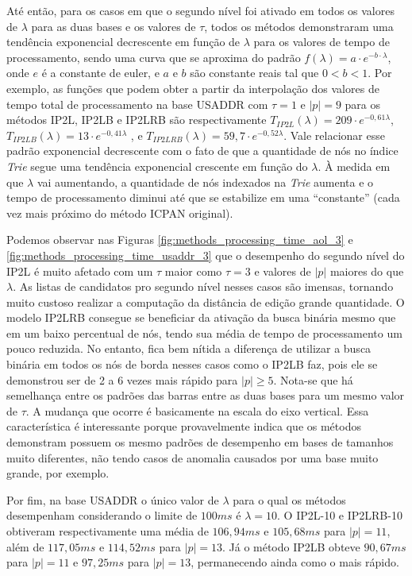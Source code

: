 Até então, para os casos em que o segundo nível foi ativado em todos os valores de $\lambda$ para as duas bases e os valores de $\tau$, todos os métodos demonstraram uma tendência exponencial decrescente em função de $\lambda$ para os valores de tempo de processamento, sendo uma curva que se aproxima do padrão $f(\lambda)=a \cdot e^{-b \cdot \lambda}$, onde $e$ é a constante de euler, e $a$ e $b$ são constante reais tal que $0 < b < 1 $. Por exemplo, as funções que podem obter a partir da interpolação dos valores de tempo total de processamento na base USADDR com $\tau=1$ e $|p|=9$ para os métodos IP2L, IP2LB e IP2LRB são respectivamente $T_{IP2L}(\lambda) = 209\cdot e^{-0,61\lambda}$, $T_{IP2LB}(\lambda)=13\cdot e^{-0,41\lambda}$ , e $T_{IP2LRB}(\lambda) = 59,7\cdot e^{-0,52\lambda}$. Vale relacionar esse padrão exponencial decrescente com o fato de que a quantidade de nós no índice \textit{Trie} segue uma tendência exponencial crescente em função do $\lambda$. À medida em que $\lambda$ vai aumentando, a quantidade de nós indexados na \textit{Trie} aumenta e o tempo de processamento diminui até que se estabilize em uma ``constante'' (cada vez mais próximo do método ICPAN original).

Podemos observar nas Figuras \ref{fig:methods_processing_time_aol_3} e \ref{fig:methods_processing_time_usaddr_3} que o desempenho do segundo nível do IP2L é muito afetado com um $\tau$ maior como $\tau=3$ e valores de $|p|$ maiores do que $\lambda$. As listas de candidatos pro segundo nível nesses casos são imensas, tornando muito custoso realizar a computação da distância de edição grande quantidade. O modelo IP2LRB consegue se beneficiar da ativação da busca binária mesmo que em um baixo percentual de nós, tendo sua média de tempo de processamento um pouco reduzida. No entanto, fica bem nítida a diferença de utilizar a busca binária em todos os nós de borda nesses casos como o IP2LB faz, pois ele se demonstrou ser de 2 a 6 vezes mais rápido para $|p| \geq 5$. Nota-se que há semelhança entre os padrões das barras entre as duas bases para um mesmo valor de $\tau$. A mudança que ocorre é basicamente na escala do eixo vertical. Essa característica é interessante porque provavelmente indica que os métodos demonstram possuem os mesmo padrões de desempenho em bases de tamanhos muito diferentes, não tendo casos de anomalia causados por uma base muito grande, por exemplo. 


Por fim, na base USADDR o único valor de $\lambda$ para o qual os métodos desempenham considerando o limite de $100ms$ é $\lambda=10$. O IP2L-10 e IP2LRB-10 obtiveram respectivamente uma média de $106,94ms$ e $105,68ms$ para $|p|=11$, além de $117,05ms$ e $114,52ms$ para $|p|=13$. Já o método IP2LB obteve $90,67ms$ para $|p|=11$ e $97,25ms$ para $|p|=13$, permanecendo ainda como o mais rápido. 


